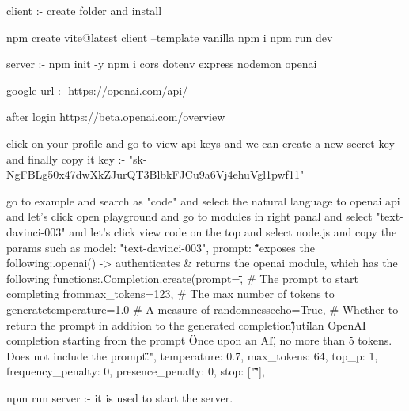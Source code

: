 client :-
create folder and install 

npm create vite@latest client --template vanilla
npm i
npm run dev

server :-
npm init -y
npm i cors dotenv express nodemon openai


google url :- https://openai.com/api/

after login
https://beta.openai.com/overview

click on your profile and go to view api keys
and we can create a new secret key
and finally copy it
key :- "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"

go to example and search as "code" and select the natural language to openai api and let's click open playground
and go to modules in right panal and select "text-davinci-003"
and let's click view code on the top and select node.js and copy the params such as
model: "text-davinci-003",
  prompt: "\"\"\"\nUtil exposes the following:\nutil.openai() -> authenticates & returns the openai module, which has the following functions:\nopenai.Completion.create(\n    prompt=\"<my prompt>\", # The prompt to start completing from\n    max_tokens=123, # The max number of tokens to generate\n    temperature=1.0 # A measure of randomness\n    echo=True, # Whether to return the prompt in addition to the generated completion\n)\n\"\"\"\nimport util\n\"\"\"\nCreate an OpenAI completion starting from the prompt \"Once upon an AI\", no more than 5 tokens. Does not include the prompt.\n\"\"\"\n",
  temperature: 0.7,
  max_tokens: 64,
  top_p: 1,
  frequency_penalty: 0,
  presence_penalty: 0,
  stop: ["\"\"\""],
 


  npm run server :- it is used to start the server.